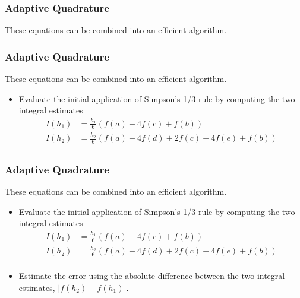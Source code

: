\documentclass{if-beamer}
\begin{document}
\begin{frame}[t]
	\frametitle{Adaptive Quadrature}
	These equations can be combined into an efficient algorithm.

\end{frame}

\begin{frame}[t]
	\frametitle{Adaptive Quadrature}
	These equations can be combined into an efficient algorithm.
	\begin{itemize}
		\item Evaluate the initial application of Simpson's 1/3 rule by computing the two integral estimates
		\begin{align*}
		I(h_1) &= \frac{h_1}{6}(f(a) + 4f(c) + f(b))\\
		I(h_2) &=\frac{h_2}{6}(f(a) +4f(d) +2f(c) +4f(e) +f(b))\\
		\end{align*}
	\end{itemize}
\end{frame}

\begin{frame}[t]
	\frametitle{Adaptive Quadrature}
	These equations can be combined into an efficient algorithm.
	\begin{itemize}
		\item Evaluate the initial application of Simpson's 1/3 rule by computing the two integral estimates
		\begin{align*}
			I(h_1) &= \frac{h_1}{6}(f(a) + 4f(c) + f(b))\\
			I(h_2) &=\frac{h_2}{6}(f(a) +4f(d) +2f(c) +4f(e) +f(b))\\
		\end{align*}
		\item Estimate the error using the absolute difference between the two integral estimates, $|f(h_2)-f(h_1)|$. 
	\end{itemize}
\end{frame}
\end{document}
